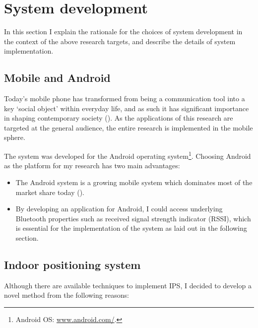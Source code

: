 \documentclass[a4paper,11pt]{article}
\begin{document}
\section{System development}

In this section I explain the rationale for the choices of system development in the context of the above research targets, and describe the details of system implementation.

\subsection{Mobile and Android}

Today's mobile phone has transformed from being a communication tool into a key `social object' within everyday life, and as such it has significant importance in shaping contemporary society (\cite{srivastava05}).
As the applications of this research are targeted at the general audience, the entire research is implemented in the mobile sphere.

The system was developed for the Android operating system\footnote{Android OS: \href{http://www.android.com/}{www.android.com/}.}.
Choosing Android as the platform for my research has two main advantages:
\begin{itemize}
	\item The Android system is a growing mobile system which dominates most of the market share today (\cite{web:idc}).
	\item By developing an application for Android, I could access underlying Bluetooth properties such as received signal strength indicator (RSSI), which is essential for the implementation of the system as laid out in the following section.
\end{itemize}

\subsection{Indoor positioning system}\label{methods:ips}

Although there are available techniques to implement IPS, I decided to develop a novel method from the following reasons:
\end{document}
